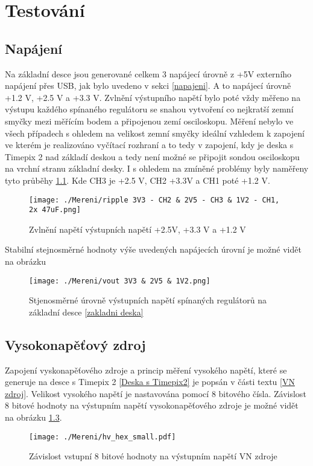 \chapter{Testování}

\section{Napájení}
Na základní desce jsou generované celkem 3 napájecí úrovně z +5V externího napájení přes USB, jak bylo uvedeno v sekci \ref{napajeni}. A to napájecí úrovně +1.2 V, +2.5 V a +3.3 V. Zvlnění výstupního napětí bylo poté vždy měřeno na výstupu každého spínaného regulátoru se snahou vytvoření co nejkratší zemní smyčky mezi měřícím bodem a připojenou zemí osciloskopu. Měření nebylo ve všech případech s ohledem na velikost zemní smyčky ideální vzhledem k zapojení ve kterém je realizováno vyčítací rozhraní a to tedy v zapojení, kdy je deska s Timepix 2 nad základí deskou a tedy není možné se připojit sondou osciloskopu na vrchní stranu základní desky. I s ohledem na zmíněné problémy byly naměřeny tyto průběhy \ref{fig:napeti}. Kde CH3 je +2.5 V, CH2 +3.3V a CH1 poté +1.2 V.
\begin{figure}[h!]
	\centering
	\captionsetup{justification=centering}
	\texttt{[image: ./Mereni/ripple 3V3 - CH2 \& 2V5 - CH3 \& 1V2 - CH1, 2x 47uF.png]}
	\caption{Zvlnění napětí výstupních napětí +2.5V, +3.3 V a +1.2 V } 
	\label{fig:napeti}
\end{figure}
Stabilní stejnosměrné hodnoty výše uvedených napájecích úrovní je možné vidět na obrázku 
\begin{figure}[h!]
	\centering
	\captionsetup{justification=centering}
	\texttt{[image: ./Mereni/vout 3V3 \& 2V5 \& 1V2.png]}
	\caption{Stjenosměrné úrovně výstupních napětí spínaných regulátorů na základní desce \ref{zakladni deska}} 
	\label{fig:urovne}
\end{figure}

\section{Vysokonapěťový zdroj}
Zapojení vyskonapěťového zdroje a princip měření vysokého napětí, které se generuje na desce s Timepix 2 \ref{Deska s Timepix2} je popsán v části textu \ref{VN zdroj}. Velikost vysokého napětí je nastavována pomocí 8 bitového čísla. Závislost 8 bitové hodnoty na výstupním napětí vysokonapěťového zdroje je možné vidět na obrázku \ref{fig:hv_hex}.
\begin{figure}[h!]
	\centering
	\captionsetup{justification=centering}
	\texttt{[image: ./Mereni/hv\_hex\_small.pdf]}
	\caption{Závislost vstupní 8 bitové hodnoty na výstupním napětí VN zdroje} 
	\label{fig:hv_hex}
\end{figure}
 
